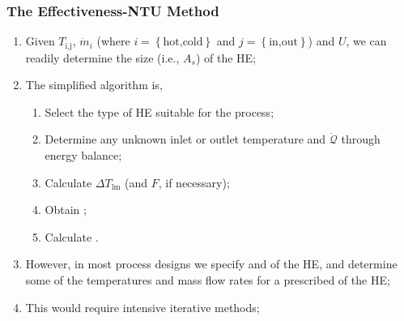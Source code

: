 \documentclass[10pt,compress,handout,ignorenonframetext,unknownkeysallowed]{beamer}
\begin{document}
\begin{frame}
  \frametitle{The Effectiveness-NTU Method}
     \begin{enumerate}%
          \item<1-> Given $T_{\text{i,j}}$, $\dot{m}_{i}$ (where $i = \left\{\text{hot,cold}\right\}$ and $j = \left\{\text{in,out}\right\}$) and $U$, we can readily determine the size (i.e., $A_{s}$) of the HE;
          \item<1-> The simplified algorithm is,
             \begin{enumerate}
                 \item<2-> Select the type of HE suitable for the process;
                 \item<2-> Determine any unknown inlet or outlet temperature and $\dot{\mathcal{Q}}$ through energy balance;
                 \item<2-> Calculate $\Delta T_{\text{lm}}$ (and $F$, if necessary);
                 \item<2-> Obtain ;
                 \item<2-> Calculate . 
             \end{enumerate}
          \item<4-> However, in most process designs we specify  and  of the HE, and determine some of the temperatures and mass flow rates for a prescribed  of the HE;
          \item<5-> This would require intensive iterative methods;
     \end{enumerate}

\end{frame}
\end{document}
